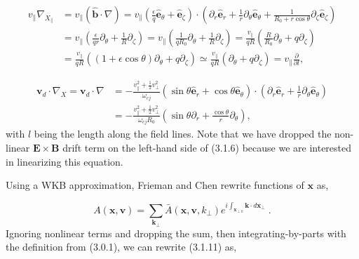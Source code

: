 \documentclass[12pt]{article}
\numberwithin{equation}{subsection}
\begin{document}
   \begin{equation}
   \begin{aligned}
         v_\parallel\nabla_{X_\parallel} &= 
         v_\parallel(\bm{\hat{b}}\cdot\nabla) = v_\parallel(\frac{\epsilon}{q}\bm{\hat{e}}_\theta +
         \bm{\hat{e}}_\zeta)\cdot(\partial_r\bm{\hat{e}}_r + \frac{1}{r}\partial_\theta\bm{\hat{e}}_\theta + \frac{1}{R_0 +
         r\cos\theta}\partial_\zeta\bm{\hat{e}}_\zeta) \\ &= 
         v_\parallel(\frac{\epsilon}{q r}\partial_\theta + \frac{1}{R}\partial_\zeta) = v_\parallel(\frac{1}{q R_0}\partial_\theta
         + \frac{1}{R}\partial_\zeta) = \frac{v_\parallel}{q R}(\frac{R}{R_0}\partial_\theta + q\partial_\zeta) \\ &=
         \frac{v_\parallel}{q R}((1+\epsilon\cos\theta)\partial_\theta + q\partial_\zeta)
         \simeq \frac{v_\parallel}{q R}(\partial_\theta + q\partial_\zeta) = v_\parallel\frac{\partial}{\partial l},
   \end{aligned}
   \end{equation}

   \begin{equation}
   \begin{aligned}
      \bm{v}_d\cdot\nabla_X = \bm{v}_d\cdot\nabla &= -\frac{v_\parallel^2 + \frac{1}{2}v_\perp^2}{\omega_{cj}}
      (\sin\theta\bm{\hat{e}}_r + \cos\theta\bm{\hat{e}}_\theta)
      \cdot(\partial_r\bm{\hat{e}}_r + \frac{1}{r}\partial_\theta\bm{\hat{e}}_\theta) \\
      &= -\frac{v_\parallel^2 + \frac{1}{2}v_\perp^2}{\omega_{cj}R_0}(\sin\theta\partial_r + \frac{\cos\theta}{r}\partial_\theta),
   \end{aligned}
   \end{equation}
with $l$ being the length along the field lines. Note that we have dropped the non-linear $\bm{E}\times\bm{B}$ drift term on the left-hand
side of (3.1.6) because we are interested in linearizing this equation.

   \quad Using a WKB approximation, Frieman and Chen rewrite functions of $\bm{x}$ as\cite{FriemanChen},
   
   \begin{equation}
      A(\bm{x}, \bm{v}) = \sum\limits_{\bm{k}_\perp}\bar{A}(\bm{x},\bm{v},k_\perp)e^{i\int_{\bm{x}_{\perp 0}}\bm{k}\cdot d\bm{x}_\perp}\;.
   \end{equation}
Ignoring nonlinear terms and dropping the sum, then integrating-by-parts with the definition from (3.0.1),
we can rewrite (3.1.11) as\cite{FriemanChen},
\end{document}

